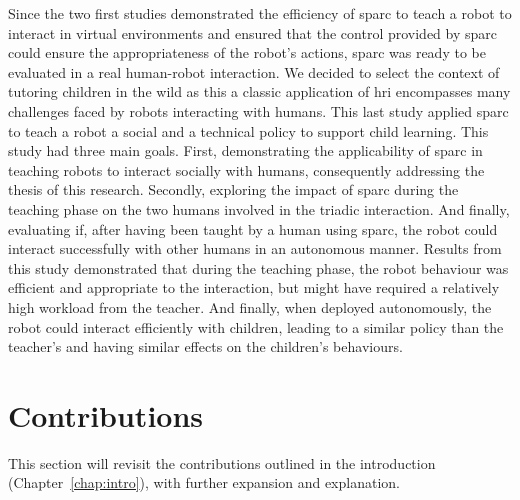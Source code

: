 Since the two first studies demonstrated the efficiency of \gls{sparc} to teach a robot to interact in virtual environments and ensured that the control provided by \gls{sparc} could ensure the appropriateness of the robot's actions, \gls{sparc} was ready to be evaluated in a real human-robot interaction. We decided to select the context of tutoring children in the wild as this a classic application of \gls{hri} encompasses many challenges faced by robots interacting with humans. This last study applied \gls{sparc} to teach a robot a social and a technical policy to support child learning. This study had three main goals. First, demonstrating the applicability of \gls{sparc} in teaching robots to interact socially with humans, consequently addressing the thesis of this research. Secondly, exploring the impact of \gls{sparc} during the teaching phase on the two humans involved in the triadic interaction. And finally, evaluating if, after having been taught by a human using \gls{sparc}, the robot could interact successfully with other humans in an autonomous manner. Results from this study demonstrated that during the teaching phase, the robot behaviour was efficient and appropriate to the interaction, but might have required a relatively high workload from the teacher. And finally, when deployed autonomously, the robot could interact efficiently with children, leading to a similar policy than the teacher's and having similar effects on the children's behaviours.

\section{Contributions}\label{sec:conc_contribution}
This section will revisit the contributions outlined in the introduction (Chapter~\ref{chap:intro}), with further expansion and explanation. 

